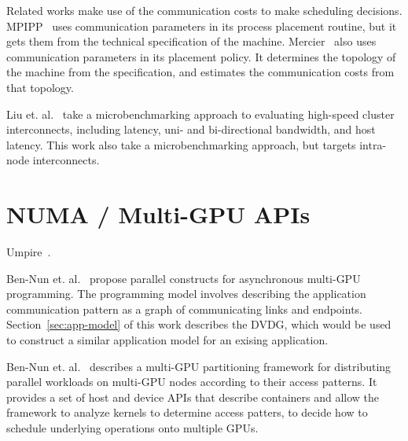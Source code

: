 Related works make use of the communication costs to make scheduling decisions.
MPIPP~\cite{chen2006mpipp} uses communication parameters in its process placement routine, but it gets them from the technical specification of the machine.
Mercier~\cite{mercier2009towards} also uses communication parameters in its placement policy.
It determines the topology of the machine from the specification, and estimates the communication costs from that topology.

Liu et. al.~\cite{liu2004microbenchmark} take a microbenchmarking approach to evaluating high-speed cluster interconnects, including latency, uni- and bi-directional bandwidth, and host latency.
This work also take a microbenchmarking approach, but targets intra-node interconnects.

\section{NUMA / Multi-GPU APIs}

Umpire~\cite{beckingsale2018umpire}.

Ben-Nun et. al.~\cite{ben2017groute} propose parallel constructs for asynchronous multi-GPU programming.
The programming model involves describing the application communication pattern as a graph of communicating links and endpoints.
Section~\ref{sec:app-model} of this work describes the DVDG, which would be used to construct a similar application model for an exising application.

Ben-Nun et. al.~\cite{ben2015memory} describes a multi-GPU partitioning framework for distributing parallel workloads on multi-GPU nodes according to their access patterns.
It provides a set of host and device APIs that describe containers and allow the framework to analyze kernels to determine access patters, to decide how to schedule underlying operations onto multiple GPUs.

